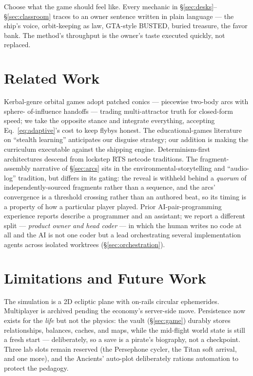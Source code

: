 \documentclass[10pt,twocolumn]{article}
\begin{document}
Choose what the game should feel like. Every mechanic in \S\ref{sec:desks}--%
\S\ref{sec:classroom} traces to an owner sentence written in plain language --- the ship's
voice, orbit-keeping as law, GTA-style BUSTED, buried treasure, the favor bank. The
method's throughput is the owner's taste executed quickly, not replaced.

\section{Related Work}

Kerbal-genre orbital games adopt patched conics --- piecewise two-body arcs with sphere-%
of-influence handoffs --- trading multi-attractor truth for closed-form speed; we take the
opposite stance and integrate everything, accepting Eq.~\eqref{eq:adaptive}'s cost to keep
flybys honest. The educational-games literature on ``stealth learning'' anticipates our
disguise strategy; our addition is making the curriculum executable against the shipping
engine. Determinism-first architectures descend from lockstep RTS netcode traditions. The
fragment-assembly narrative of \S\ref{sec:arcs} sits in the environmental-storytelling and
``audio-log'' tradition, but differs in its gating: the reveal is withheld behind a
\emph{quorum} of independently-sourced fragments rather than a sequence, and the arcs'
convergence is a threshold crossing rather than an authored beat, so its timing is a property
of how a particular player played.
Prior AI-pair-programming experience reports describe a programmer and an assistant; we
report a different split --- \emph{product owner and head coder} --- in which the human
writes no code at all and the AI is not one coder but a lead orchestrating several
implementation agents across isolated worktrees (\S\ref{sec:orchestration}).

\section{Limitations and Future Work}

The simulation is a 2D ecliptic plane with on-rails circular ephemerides. Multiplayer is
archived pending the economy's server-side move. Persistence now exists for the
\emph{life} but not the physics: the vault (\S\ref{sec:game}) durably stores relationships,
balances, caches, and maps, while the mid-flight world state is still a fresh start ---
deliberately, so a save is a pirate's biography, not a checkpoint. Three lab slots remain
reserved (the Persephone cycler, the Titan soft arrival, and one more), and the Ancients'
auto-plot deliberately rations automation to protect the pedagogy.
\end{document}

